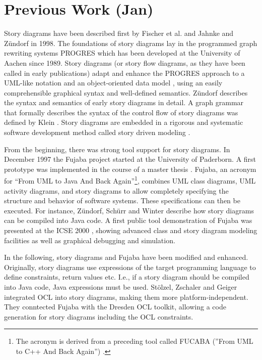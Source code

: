 \section{Previous Work (Jan)}


Story diagrams have been described first by Fischer et al. \cite{FNTZ00} and Jahnke and Z\"{u}ndorf \cite{JZ98} in 1998.
The foundations of story diagrams lay in the programmed graph rewriting systems PROGRES \cite{SWZ95} which has been developed at the University of Aachen since 1989.
Story diagrams (or story flow diagrams, as they have been called in early publications) adapt and enhance the PROGRES approach to a UML-like notation and an object-oriented data model \cite{JZ98}, using an easily comprehensible graphical syntax and well-defined semantics.
Z\"{u}ndorf \cite{Zun01} describes the syntax and semantics of early story diagrams in detail.
A graph grammar that formally describes the syntax of the control flow of story diagrams was defined by Klein \cite{Kle99}.
Story diagrams are embedded in a rigorous and systematic software development method called story driven modeling \cite{Zun01,DGZ04}.

From the beginning, there was strong tool support for story diagrams.
In December 1997 the Fujaba project started at the University of Paderborn.
A first prototype was implemented in the course of a master thesis \cite{FNT98}.
Fujaba, an acronym for ``From UML to Java And Back Again''\footnote{The acronym is derived from a preceding tool called FUCABA (''From UML to C++ And Back Again'') \cite{JZ97}.}, combines UML class diagrams, UML activity diagrams, and story diagrams to allow completely specifying the structure and behavior of software systems.
These specifications can then be executed.
For instance, Z\"{u}ndorf, Sch\"{u}rr and Winter \cite{ZSW99} describe how story diagrams can be compiled into Java code.
A first public tool demonstration of Fujaba was presented at the ICSE 2000 \cite{NNZ00}, showing advanced class and story diagram modeling facilities as well as graphical debugging and simulation.

In the following, story diagrams and Fujaba have been modified and enhanced.
Originally, story diagrams use expressions of the target programming language to define constraints, return values etc.
I.e., if a story diagram should be compiled into Java code, Java expressions must be used.
St\"{o}lzel, Zschaler and Geiger \cite{SZG07} integrated OCL into story diagrams, making them more platform-independent.
They conntected Fujaba with the Dresden OCL toolkit, allowing a code generation for story diagrams including the OCL constraints.

